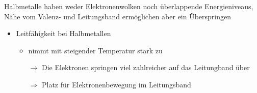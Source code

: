     Halbmetalle haben weder Elektronenwolken noch überlappende Energieniveaus, Nähe vom Valenz- und Leitungsband ermöglichen aber ein Überspringen
    \begin{itemize}
        \item Leitfähigkeit bei Halbmetallen 
        \begin{itemize}
            \item nimmt mit steigender Temperatur stark zu
            
                $\rightarrow$ Die Elektronen springen viel zahlreicher auf das Leitungband über
                
                $\Rightarrow$ Platz für Elektronenbewegung im Leitungsband
        \end{itemize}
    \end{itemize}

